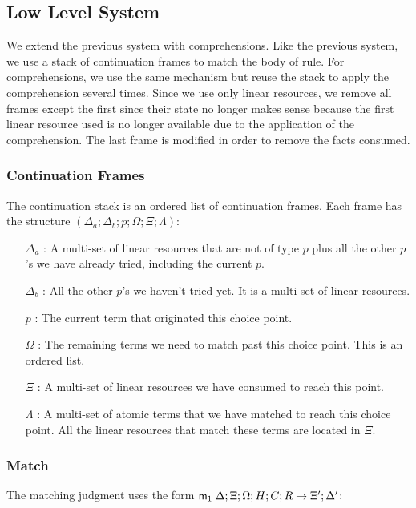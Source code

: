 

\subsection{Low Level System}

We extend the previous system with comprehensions. Like the previous system, we use a stack of continuation frames to match the body of rule. For comprehensions, we use the same mechanism but reuse the stack to apply the comprehension several times. Since we use only linear resources, we remove all frames except the first since their state no longer makes sense because the first linear resource used is no longer available due to the application of the comprehension. The last frame is modified in order to remove the facts consumed.

\subsubsection{Continuation Frames}

The continuation stack is an ordered list of continuation frames. Each frame has the structure $(\Delta_a; \Delta_b; p; \Omega; \Xi; \Lambda)$:

\begin{enumerate}
   \item[$\Delta_a$]: A multi-set of linear resources that are not of type $p$ plus all the other $p$'s we have already tried, including the current $p$.
   \item[$\Delta_b$]: All the other $p$'s we haven't tried yet. It is a multi-set of linear resources.
   \item[$p$]: The current term that originated this choice point.
   \item[$\Omega$]: The remaining terms we need to match past this choice point. This is an ordered list.
   \item[$\Xi$]: A multi-set of linear resources we have consumed to reach this point.
   \item[$\Lambda$]: A multi-set of atomic terms that we have matched to reach this choice point. All the linear resources that match these terms are located in $\Xi$. 
\end{enumerate}

\subsubsection{Match}

The matching judgment uses the form $\mathsf{m}_1 \; \Delta; \Xi; \Omega; H; C; R \rightarrow \Xi'; \Delta'$:

